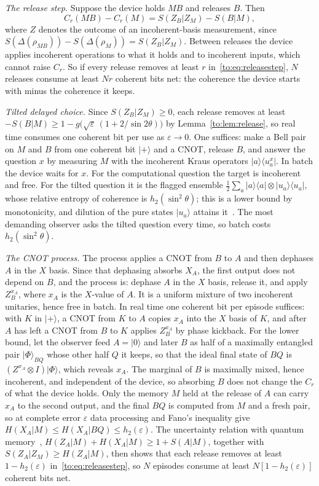 \emph{The release step.} Suppose the device holds $MB$ and releases $B$. Then
\begin{equation}\label{to:eq:releasestep}
C_r(MB)-C_r(M)=S(Z_B|Z_M)-S(B|M),
\end{equation}
where $Z$ denotes the outcome of an incoherent-basis measurement, since $S(\Delta(\rho_{MB}))-S(\Delta(\rho_M))=S(Z_B|Z_M)$. Between releases the device applies incoherent operations to what it holds and to incoherent inputs, which cannot raise $C_r$. So if every release removes at least $r$ in~\eqref{to:eq:releasestep}, $N$ releases consume at least $Nr$ coherent bits net: the coherence the device starts with minus the coherence it keeps.

\emph{Tilted delayed choice.} Since $S(Z_B|Z_M)\ge0$, each release removes at least $-S(B|M)\ge1-g\bigl(\sqrt\varepsilon\,(1+2/\sin2\theta)\bigr)$ by Lemma~\ref{to:lem:release}, so real time consumes one coherent bit per use as $\varepsilon\to0$. One suffices: make a Bell pair on $M$ and $B$ from one coherent bit $|+\rangle$ and a CNOT, release $B$, and answer the question $x$ by measuring $M$ with the incoherent Kraus operators $|a\rangle\langle u^x_a|$. In batch the device waits for $x$. For the computational question the target is incoherent and free. For the tilted question it is the flagged ensemble $\tfrac12\sum_a|a\rangle\langle a|\otimes|u_a\rangle\langle u_a|$, whose relative entropy of coherence is $h_2(\sin^2\theta)$; this is a lower bound by monotonicity, and dilution of the pure states $|u_a\rangle$ attains it~\cite{WinterYang16}. The most demanding observer asks the tilted question every time, so batch costs $h_2(\sin^2\theta)$.

\emph{The CNOT process.} The process applies a CNOT from $B$ to $A$ and then dephases $A$ in the $X$ basis. Since that dephasing absorbs $X_A$, the first output does not depend on $B$, and the process is: dephase $A$ in the $X$ basis, release it, and apply $Z_B^{x_A}$, where $x_A$ is the $X$-value of $A$. It is a uniform mixture of two incoherent unitaries, hence free in batch. In real time one coherent bit per episode suffices: with $K$ in $|+\rangle$, a CNOT from $K$ to $A$ copies $x_A$ into the $X$ basis of $K$, and after $A$ has left a CNOT from $B$ to $K$ applies $Z_B^{x_A}$ by phase kickback. For the lower bound, let the observer feed $A=|0\rangle$ and later $B$ as half of a maximally entangled pair $|\Phi\rangle_{BQ}$ whose other half $Q$ it keeps, so that the ideal final state of $BQ$ is $(Z^{x_A}\otimes I)|\Phi\rangle$, which reveals $x_A$. The marginal of $B$ is maximally mixed, hence incoherent, and independent of the device, so absorbing $B$ does not change the $C_r$ of what the device holds. Only the memory $M$ held at the release of $A$ can carry $x_A$ to the second output, and the final $BQ$ is computed from $M$ and a fresh pair, so at complete error $\varepsilon$ data processing and Fano's inequality give $H(X_A|M)\le H(X_A|BQ)\le h_2(\varepsilon)$. The uncertainty relation with quantum memory~\cite{BCCRR10}, $H(Z_A|M)+H(X_A|M)\ge1+S(A|M)$, together with $S(Z_A|Z_M)\ge H(Z_A|M)$, then shows that each release removes at least $1-h_2(\varepsilon)$ in~\eqref{to:eq:releasestep}, so $N$ episodes consume at least $N[1-h_2(\varepsilon)]$ coherent bits net.

